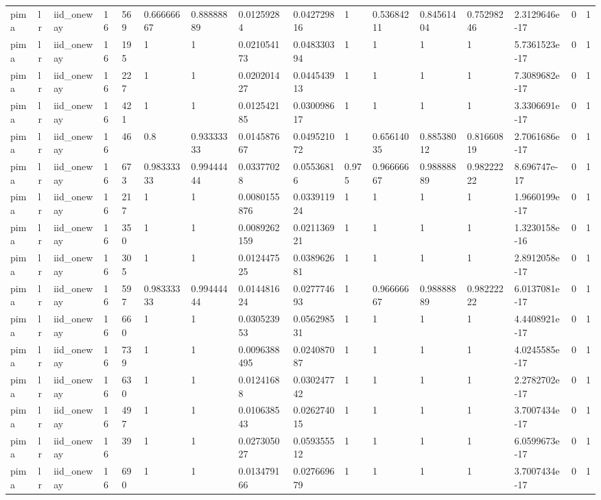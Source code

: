 \begin{tabular}{llllllllllllllll}
pima & lr & iid\_oneway & 16 & 569 & 0.66666667 & 0.88888889 & 0.01259284 & 0.042729816 & 1 & 0.53684211 & 0.84561404 & 0.75298246 & 2.3129646e-17 & 0 & 1 \\
pima & lr & iid\_oneway & 16 & 195 & 1 & 1 & 0.021054173 & 0.048330394 & 1 & 1 & 1 & 1 & 5.7361523e-17 & 0 & 1 \\
pima & lr & iid\_oneway & 16 & 227 & 1 & 1 & 0.020201427 & 0.044543913 & 1 & 1 & 1 & 1 & 7.3089682e-17 & 0 & 1 \\
pima & lr & iid\_oneway & 16 & 421 & 1 & 1 & 0.012542185 & 0.030098617 & 1 & 1 & 1 & 1 & 3.3306691e-17 & 0 & 1 \\
pima & lr & iid\_oneway & 16 & 46 & 0.8 & 0.93333333 & 0.014587667 & 0.049521072 & 1 & 0.65614035 & 0.88538012 & 0.81660819 & 2.7061686e-17 & 0 & 1 \\
pima & lr & iid\_oneway & 16 & 673 & 0.98333333 & 0.99444444 & 0.03377028 & 0.05536816 & 0.975 & 0.96666667 & 0.98888889 & 0.98222222 & 8.696747e-17 & 0 & 1 \\
pima & lr & iid\_oneway & 16 & 217 & 1 & 1 & 0.0080155876 & 0.033911924 & 1 & 1 & 1 & 1 & 1.9660199e-17 & 0 & 1 \\
pima & lr & iid\_oneway & 16 & 350 & 1 & 1 & 0.0089262159 & 0.021136921 & 1 & 1 & 1 & 1 & 1.3230158e-16 & 0 & 1 \\
pima & lr & iid\_oneway & 16 & 305 & 1 & 1 & 0.012447525 & 0.038962681 & 1 & 1 & 1 & 1 & 2.8912058e-17 & 0 & 1 \\
pima & lr & iid\_oneway & 16 & 597 & 0.98333333 & 0.99444444 & 0.014481624 & 0.027774693 & 1 & 0.96666667 & 0.98888889 & 0.98222222 & 6.0137081e-17 & 0 & 1 \\
pima & lr & iid\_oneway & 16 & 660 & 1 & 1 & 0.030523953 & 0.056298531 & 1 & 1 & 1 & 1 & 4.4408921e-17 & 0 & 1 \\
pima & lr & iid\_oneway & 16 & 739 & 1 & 1 & 0.0096388495 & 0.024087087 & 1 & 1 & 1 & 1 & 4.0245585e-17 & 0 & 1 \\
pima & lr & iid\_oneway & 16 & 630 & 1 & 1 & 0.01241688 & 0.030247742 & 1 & 1 & 1 & 1 & 2.2782702e-17 & 0 & 1 \\
pima & lr & iid\_oneway & 16 & 497 & 1 & 1 & 0.010638543 & 0.026274015 & 1 & 1 & 1 & 1 & 3.7007434e-17 & 0 & 1 \\
pima & lr & iid\_oneway & 16 & 39 & 1 & 1 & 0.027305027 & 0.059355512 & 1 & 1 & 1 & 1 & 6.0599673e-17 & 0 & 1 \\
pima & lr & iid\_oneway & 16 & 690 & 1 & 1 & 0.013479166 & 0.027669679 & 1 & 1 & 1 & 1 & 3.7007434e-17 & 0 & 1 \\

\end{tabular}

